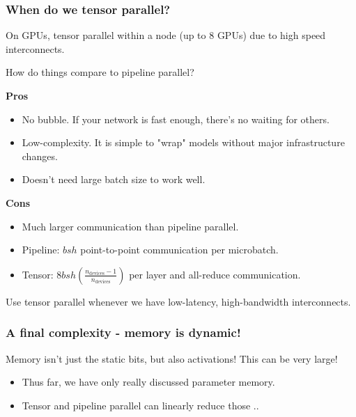 \documentclass[12pt,twoside]{article}
\begin{document}
\subsubsection*{When do we tensor parallel?}

On GPUs, tensor parallel within a node (up to 8 GPUs) due to high speed interconnects.

\begin{center}
    How do things compare to pipeline parallel?
\end{center}

\textbf{Pros}

\begin{itemize}
    \item No bubble. If your network is fast enough, there's no waiting for others.
    \item Low-complexity. It is simple to "wrap" models without major infrastructure changes.
    \item Doesn't need large batch size to work well.
\end{itemize}

\textbf{Cons}

\begin{itemize}
    \item Much larger communication than pipeline parallel.
    \item Pipeline: \(bsh\) point-to-point communication per microbatch.
    \item Tensor: \(8bsh \left(\frac{n_{\text{devices}} - 1}{n_{\text{devices}}}\right)\) per layer and all-reduce communication.
\end{itemize}

\begin{center}
    Use tensor parallel whenever we have low-latency, high-bandwidth interconnects. 
\end{center}

\subsubsection*{A final complexity - memory is dynamic!}

Memory isn't just the static bits, but also activations! This can be very large!

\begin{itemize}
    \item Thus far, we have only really discussed parameter memory.
    \item Tensor and pipeline parallel can linearly reduce those .. 
\end{itemize}
\end{document}
